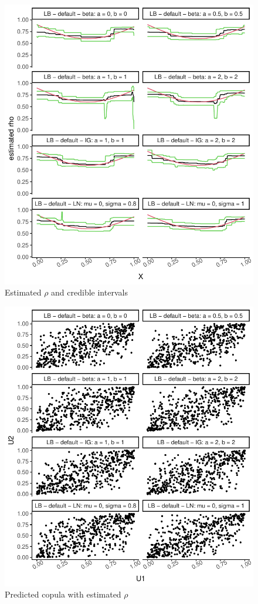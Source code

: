 \documentclass{amsart}
\begin{document}
\fi
\begin{figure}[ht]
	\centering
	\includegraphics[width=0.95\linewidth]{predicted_rho_4.pdf}
	\caption{Estimated $\rho$ and credible intervals}
	\label{fig:pred:rho:4}
\end{figure}

\begin{figure}[ht]
	\centering
	\includegraphics[width=0.95\linewidth]{simulated_copula_4.pdf}
	\caption{Predicted copula with estimated $\rho$}
	\label{fig:sim:copula:4}
\end{figure}
\end{document}
